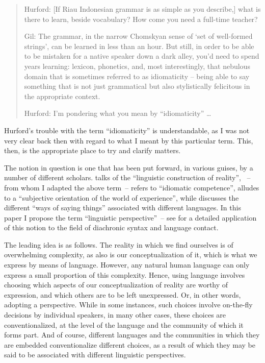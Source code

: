 \documentclass[output=paper,colorlinks,citecolor=brown
]{langscibook}
\begin{document}
\begin{quote}
    Hurford:	[If Riau Indonesian grammar is as simple as you describe,] what is there to learn, beside vocabulary? How come you need a full-time teacher?

    Gil: The grammar, in the narrow Chomskyan sense of ‘set of well-formed strings’, can be learned in less than an hour. But still, in order to be able to be mistaken for a native speaker down a dark alley, you’d need to spend years learning: lexicon, phonetics, and, most interestingly, that nebulous domain that is sometimes referred to as idiomaticity – being able to say something that is not just grammatical but also stylistically felicitous in the appropriate context.

    Hurford:	I'm pondering what you mean by ``idiomaticity''  \ldots 
\end{quote}

Hurford's trouble with the term ``idiomaticity'' is understandable, as I was not very clear back then with regard to what I meant by this particular term.  This, then, is the appropriate place to try and clarify matters.

The notion in question is one that has been put forward, in various guises, by a number of different
scholars. \citet{grace1987linguistic} talks of the ``linguistic construction of reality'',
\citet{pawley1993language}~– from whom I adapted the above term~– refers to ``idiomatic competence'',
\citet[91]{slobin1996thought} alludes to a ``subjective orientation of the world of experience'',
while \citet{ross2001contact} discusses the different ``ways of saying things'' associated with
different languages.  In this paper I propose the term ``linguistic perspective''~– see \citet{gil2023recent} for a detailed application of this notion to the field of diachronic syntax and language contact.

The leading idea is as follows.  The reality in which we find ourselves is of overwhelming complexity, as also is our conceptualization of it, which is what we express by means of language.  However, any natural human language can only express a small proportion of this complexity.  Hence, using language involves choosing which aspects of our conceptualization of reality are worthy of expression, and which others are to be left unexpressed.  Or, in other words, adopting a perspective.  While in some instances, such choices involve on-the-fly decisions by individual speakers, in many other cases, these choices are conventionalized, at the level of the language and the community of which it forms part.  And of course, different languages and the communities in which they are embedded conventionalize different choices, as a result of which they may be said to be associated with different linguistic perspectives.
\end{document}

